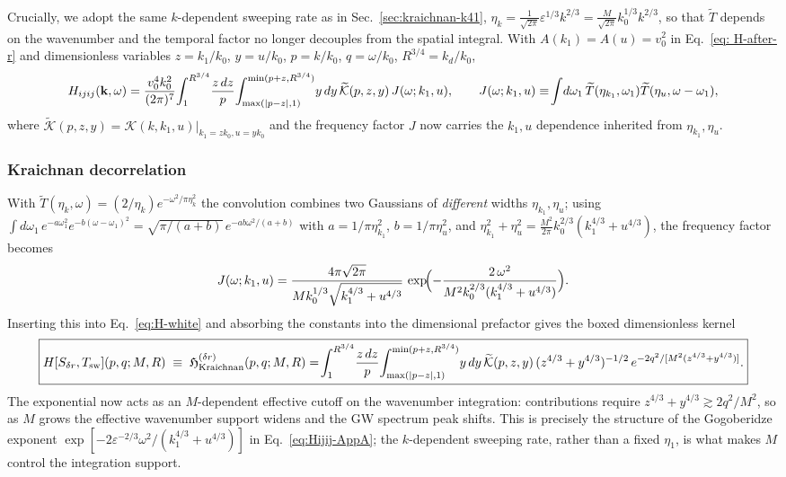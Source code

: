 \documentclass[10pt,prd,aps,nobibnotes,superscriptaddress,preprintnumbers,notitlepage]{revtex4-1}
\newcommand{\kb}{{\bf k}}
\begin{document}
Crucially, we adopt the same $k$-dependent sweeping rate as in Sec.~\ref{sec:kraichnan-k41}, $\eta_k=\tfrac{1}{\sqrt{2\pi}}\varepsilon^{1/3}k^{2/3}=\tfrac{M}{\sqrt{2\pi}}k_0^{1/3}k^{2/3}$, so that $\widetilde T$ depends on the wavenumber and the temporal factor no longer decouples from the spatial integral. With $A(k_1)=A(u)=v_0^2$ in Eq.~\eqref{eq: H-after-r} and dimensionless variables $z=k_1/k_0$, $y=u/k_0$, $p=k/k_0$, $q=\omega/k_0$, $R^{3/4}=k_d/k_0$,
\begin{equation}
  H_{ijij}(\kb,\omega) = \frac{v_0^4 k_0^2}{(2\pi)^7}\!\int_{1}^{R^{3/4}}\!\frac{z\,dz}{p}\!\int_{\max(|p-z|,1)}^{\min(p+z,R^{3/4})}\!y\,dy\,\widetilde{\mathcal K}(p,z,y)\,J(\omega;k_1,u),
  \qquad
  J(\omega;k_1,u)\equiv\!\int\!d\omega_1\,\widetilde T(\eta_{k_1},\omega_1)\widetilde T(\eta_u,\omega-\omega_1),
  \label{eq:H-white}
\end{equation}
where $\widetilde{\mathcal K}(p,z,y) = \mathcal K(k,k_1,u)|_{k_1=zk_0,u=yk_0}$ and the frequency factor $J$ now carries the $k_1,u$ dependence inherited from $\eta_{k_1},\eta_u$.

\subsubsection{Kraichnan decorrelation}

With $\widetilde T(\eta_k,\omega)=(2/\eta_k)e^{-\omega^2/\pi\eta_k^2}$ the convolution combines two Gaussians of \emph{different} widths $\eta_{k_1},\eta_u$; using $\int d\omega_1\,e^{-a\omega_1^2}e^{-b(\omega-\omega_1)^2}=\sqrt{\pi/(a+b)}\,e^{-ab\omega^2/(a+b)}$ with $a=1/\pi\eta_{k_1}^2$, $b=1/\pi\eta_u^2$, and $\eta_{k_1}^2+\eta_u^2=\tfrac{M^2}{2\pi}k_0^{2/3}(k_1^{4/3}+u^{4/3})$, the frequency factor becomes
\begin{equation}
  J(\omega;k_1,u) = \frac{4\pi\sqrt{2\pi}}{M k_0^{1/3}\sqrt{k_1^{4/3}+u^{4/3}}}\,
  \exp\!\Bigl(-\frac{2\,\omega^2}{M^2 k_0^{2/3}(k_1^{4/3}+u^{4/3})}\Bigr).
  \label{eq:J-white-Kraichnan}
\end{equation}
Inserting this into Eq.~\eqref{eq:H-white} and absorbing the constants into the dimensional prefactor gives the boxed dimensionless kernel
\begin{equation}
  \boxed{
  H[S_{\delta r},T_{\rm sw}](p,q;M,R)\;\equiv\;\mathfrak{H}^{(\delta r)}_{\rm Kraichnan}(p,q;M,R) = \!\int_{1}^{R^{3/4}}\!\frac{z\,dz}{p}\!\int_{\max(|p-z|,1)}^{\min(p+z,R^{3/4})}\!y\,dy\,\widetilde{\mathcal K}(p,z,y)\,(z^{4/3}+y^{4/3})^{-1/2}\,e^{-2q^2/[M^2(z^{4/3}+y^{4/3})]}.
  }
  \label{eq:dimless-white-Kraichnan}
\end{equation}
The exponential now acts as an $M$-dependent effective cutoff on the wavenumber integration: contributions require $z^{4/3}+y^{4/3}\gtrsim 2q^2/M^2$, so as $M$ grows the effective wavenumber support widens and the GW spectrum peak shifts. This is precisely the structure of the Gogoberidze exponent $\exp[-2\varepsilon^{-2/3}\omega^2/(k_1^{4/3}+u^{4/3})]$ in Eq.~\eqref{eq:Hijij-AppA}; the $k$-dependent sweeping rate, rather than a fixed $\eta_1$, is what makes $M$ control the integration support.
\end{document}

